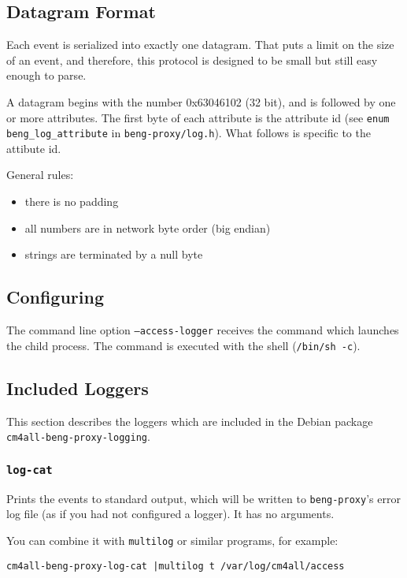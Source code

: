 \documentclass[a4paper,12pt]{article}
\begin{document}
\subsection{Datagram Format}

Each event is serialized into exactly one datagram.  That puts a limit
on the size of an event, and therefore, this protocol is designed to
be small but still easy enough to parse.

A datagram begins with the number 0x63046102 (32 bit), and is followed
by one or more attributes.  The first byte of each attribute is the
attribute id (see \texttt{enum beng\_log\_attribute} in
\texttt{beng-proxy/log.h}).  What follows is specific to the attibute
id.

General rules:

\begin{itemize}
\item there is no padding
\item all numbers are in network byte order (big endian)
\item strings are terminated by a null byte
\end{itemize}

\subsection{Configuring}

The command line option \texttt{--access-logger} receives the command
which launches the child process.  The command is executed with the
shell (\texttt{/bin/sh -c}).

\subsection{Included Loggers}

This section describes the loggers which are included in the Debian
package \texttt{cm4all-beng-proxy-logging}.

\subsubsection{\texttt{log-cat}}

Prints the events to standard output, which will be written to
\texttt{beng-proxy}'s error log file (as if you had not configured a
logger).  It has no arguments.

You can combine it with \texttt{multilog} or similar programs, for
example:

\begin{verbatim}
cm4all-beng-proxy-log-cat |multilog t /var/log/cm4all/access
\end{verbatim}
\end{document}
